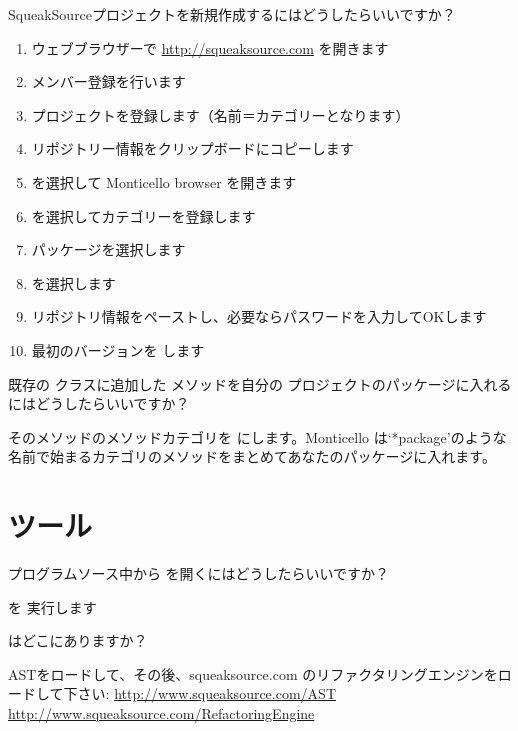 \documentclass[a4paper,10pt,twoside]{book}
\begin{document}
\begin{faq}
SqueakSourceプロジェクトを新規作成するにはどうしたらいいですか？
\end{faq}
\answer
\begin{enumerate}
  \item ウェブブラウザーで \url{http://squeaksource.com} を開きます
  \item メンバー登録を行います
  \item プロジェクトを登録します（名前＝カテゴリーとなります）
  \item リポジトリー情報をクリップボードにコピーします
  \item {} を選択して Monticello browser を開きます
  \item {} を選択してカテゴリーを登録します
  \item パッケージを選択します
  \item {} を選択します
  \item リポジトリ情報をペーストし、必要ならパスワードを入力してOKします
  \item 最初のバージョンを  します
\end{enumerate}

\begin{faq}
既存の  クラスに追加した  メソッドを自分の  プロジェクトのパッケージに入れるにはどうしたらいいですか？
\end{faq}
\answer
そのメソッドのメソッドカテゴリを  にします。Monticello は‘*package’のような名前で始まるカテゴリのメソッドをまとめてあなたのパッケージに入れます。

\section{ツール}

\begin{faq}
プログラムソース中から   を開くにはどうしたらいいですか？
\end{faq}
\answer
  を 実行します

\begin{faq}
 はどこにありますか？ 
\end{faq}
\answer
ASTをロードして、その後、squeaksource.com のリファクタリングエンジンをロードして下さい:
\url{http://www.squeaksource.com/AST}
\url{http://www.squeaksource.com/RefactoringEngine}
\end{document}
